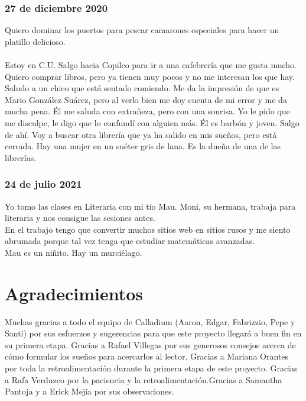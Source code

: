\documentclass[12pt]{book}
\begin{document}
\subsection*{\hfill27 de diciembre 2020}
Quiero dominar los puertos para pescar camarones especiales para hacer un platillo delicioso.
\\
\\
Estoy en C.U. Salgo hacia Copilco para ir a una cafebrería que me gusta mucho. Quiero comprar libros, pero ya tienen muy pocos y no me interesan los que hay. Saludo a un chico que está sentado comiendo. Me da la impresión de que es Mario González Suárez, pero al verlo bien me doy cuenta de mi error y me da mucha pena. Él me saluda con extrañeza, pero con una sonrisa. Yo le pido que me disculpe, le digo que lo confundí con alguien más. Él es barbón y joven.
Salgo de ahí. Voy a buscar otra librería que ya ha salido en mis sueños, pero está cerrada. Hay una mujer en un suéter gris de lana. Es la dueña de una de las librerías.
 
\subsection*{\hfill 24 de julio 2021}
Yo tomo las clases en Literaria con mi tío Mau. Moni, su hermana, trabaja para literaria y nos consigue las sesiones antes. \\
En el trabajo tengo que convertir muchos sitios web en sitios rusos y me siento abrumada porque tal vez tenga que estudiar matemáticas avanzadas.\\
Mau es un niñito. Hay un murciélago.


\newpage
\chapter*{Agradecimientos}
\thispagestyle{empty}
Muchas gracias a todo el equipo de Calladium (Aaron, Edgar, Fabrizzio, Pepe y Santi) por sus esfuerzos y sugerencias para que este proyecto llegará a buen fin en su primera etapa. Gracias a Rafael Villegas por sus generosos consejos acerca de cómo formular los sueños para acercarlos al lector. Gracias a Mariana Orantes por toda la retroalimentación durante la primera etapa de este proyecto. Gracias a Rafa Verduzco por la paciencia y la retroalimentación.Gracias a Samantha Pantoja y a Erick Mejía por sus observaciones.

\newpage
\thispagestyle{empty}
\end{document}
